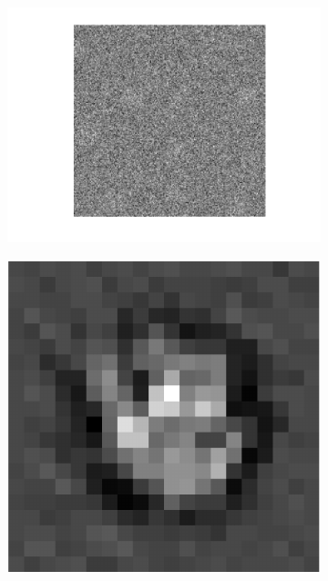 \documentclass[english,11pt]{article}
\numberwithin{equation}{section}
\theoremstyle{plain}
\theoremstyle{definition}
\theoremstyle{remark}
\theoremstyle{plain}
\theoremstyle{remark}
\theoremstyle{plain}
\theoremstyle{plain}
\begin{document}
\begin{figure}
\begin{subfigure}{.6\textwidth}
\centering
\includegraphics[scale=0.6]{data2D_noisy_1}
\vspace*{-20pt}
\caption{}
\label{fig:data2D_noisy_1}
\end{subfigure}
\begin{subfigure}{.6\textwidth}
	\centering
	\includegraphics[scale=0.6]{signal2D_LS_intermediate}
	\caption{}
	\label{fig:signal2D_LS_inter}
\end{subfigure}


\end{figure}
\end{document}
